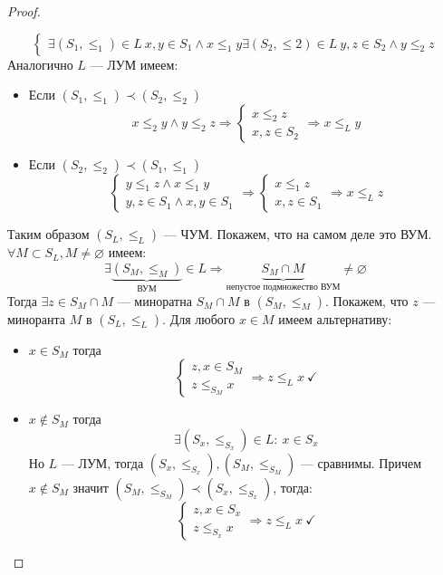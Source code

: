 \begin{proof}
\begin{enumerate}
$$		\begin{cases}
			\exists (S_1, \leq_1) \in L \ x,y \in S_1 \wedge x \leq_1 y
			\exists (S_2, \leq 2) \in L \ y,z \in S_2 \wedge y \leq_2 z
		\end{cases}
		$$
		Аналогично $L$ --- ЛУМ имеем:
		\begin{itemize}
			\item Если $(S_1, \leq_1) \prec (S_2, \leq_2)$
			$$
			x\leq_2 y \wedge y \leq_2 z \Rightarrow
			\begin{cases}
				x \leq_2 z \\
				x,z \in S_2 
			\end{cases} \Rightarrow x \leq_L y
			$$
			\item Если $(S_2, \leq_2) \prec (S_1, \leq_1)$
			$$
			\begin{cases}
				y \leq_1 z \wedge x \leq_1 y \\
				y,z \in S_1 \wedge x,y \in S_1
			\end{cases}
			\Rightarrow 
			\begin{cases}
				x \leq_1 z \\
				x,z \in S_1 
			\end{cases}
			\Rightarrow x \leq_L z 
			$$
		\end{itemize}
	\end{enumerate}
	Таким образом $(S_L, \leq_L)$ --- ЧУМ. Покажем, что на самом деле это ВУМ. $\forall M \subset S_L, M \neq \varnothing$ имеем:
	$$
	\exists \underbrace{(S_{M}, \leq_{M})}_{\text{ВУМ}}\in L \Rightarrow \underbrace{S_M \cap M}_{\text{непустое подмножество ВУМ}} \neq \varnothing
	$$
	Тогда $\exists z \in S_M \cap M$ --- миноратна $S_M \cap M$ в $(S_M, \leq_M)$. Покажем, что $z$ --- миноранта $M$ в $(S_L, \leq_L)$. Для любого $x \in M$ имеем альтернативу:
	\begin{itemize}
		\item $x \in S_M$ тогда 
		$$
		\begin{cases}
			z, x \in S_M \\
			z \leq_{S_M} x
		\end{cases} \Rightarrow z \leq_{L} x \ \checkmark
		$$
		\item $x \notin S_M$ тогда 
		$$
		\exists (S_x, \leq_{S_x}) \in L: \ x \in S_x 
		$$
		Но $L$ --- ЛУМ, тогда $(S_x, \leq_{S_x}), (S_M, \leq_{S_M})$ --- сравнимы. Причем $x \notin S_M$ значит $(S_M, \leq_{S_M}) \prec (S_x, \leq_{S_x})$, тогда:
		$$
		\begin{cases}
			z,x \in S_x \\
			z \leq_{S_x} x
		\end{cases} \Rightarrow z \leq_{L} x \ \checkmark
$$
\end{itemize}
\end{proof}
